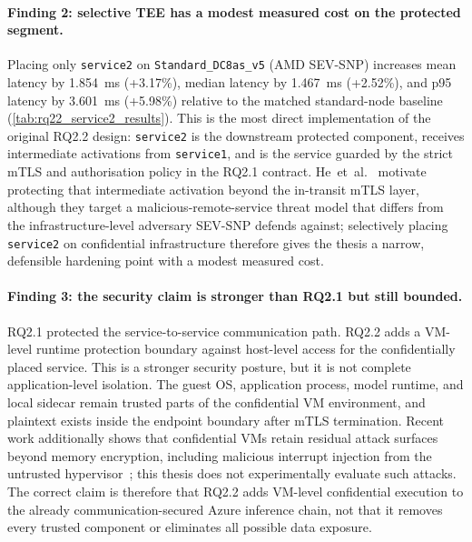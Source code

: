 \paragraph{Finding 2: selective TEE has a modest measured cost on the protected segment.}
Placing only \texttt{service2} on \texttt{Standard\_DC8as\_v5} (AMD SEV-SNP)
increases mean latency by 1.854~ms (+3.17\%), median latency by 1.467~ms
(+2.52\%), and p95 latency by 3.601~ms (+5.98\%) relative to the matched
standard-node baseline (\cref{tab:rq22_service2_results}). This is the most
direct implementation of the original RQ2.2 design: \texttt{service2} is the
downstream protected component, receives intermediate activations from
\texttt{service1}, and is the service guarded by the strict mTLS and
authorisation policy in the RQ2.1 contract. He~et~al.\
\cite{he2021_attacking_collaborative} motivate protecting that intermediate
activation beyond the in-transit mTLS layer, although they target a
malicious-remote-service threat model that differs from the
infrastructure-level adversary SEV-SNP defends against; selectively placing
\texttt{service2} on confidential infrastructure therefore gives the thesis a
narrow, defensible hardening point with a modest measured cost.

\paragraph{Finding 3: the security claim is stronger than RQ2.1 but still bounded.}
RQ2.1 protected the service-to-service communication path. RQ2.2 adds a
VM-level runtime protection boundary against host-level access for the
confidentially placed service. This is a stronger security posture, but it is
not complete application-level isolation. The guest OS, application process,
model runtime, and local sidecar remain trusted parts of the confidential VM
environment, and plaintext exists inside the endpoint boundary after mTLS
termination. Recent work additionally shows that confidential VMs retain
residual attack surfaces beyond memory encryption, including malicious
interrupt injection from the untrusted
hypervisor~\cite{schluter2024_heckler}; this thesis does not experimentally
evaluate such attacks. The correct claim is therefore that RQ2.2 adds
VM-level confidential execution to the already communication-secured Azure
inference chain, not that it removes every trusted component or eliminates
all possible data exposure.

